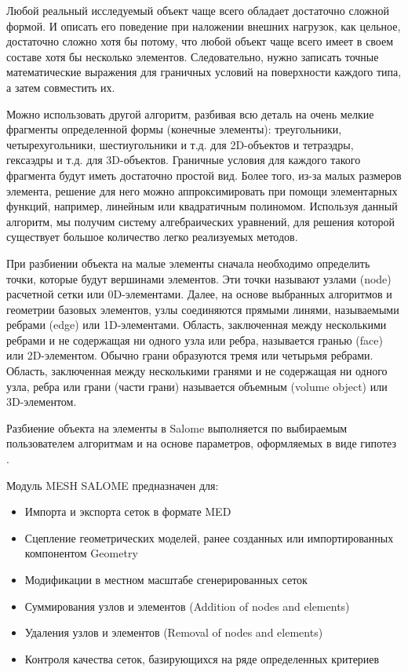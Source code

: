 \documentclass[a4paper,12pt]{article}
\theoremstyle{plain} %
\theoremstyle{definition} %
\theoremstyle{remark} %
\begin{document}
	Любой реальный исследуемый объект чаще всего обладает достаточно сложной формой. И описать его поведение при наложении внешних нагрузок, как цельное, достаточно сложно хотя бы потому, что любой объект чаще всего имеет в своем составе хотя бы несколько элементов. Следовательно, нужно записать точные математические выражения для граничных условий на поверхности каждого типа, а затем совместить их.
		
	Можно использовать другой алгоритм, разбивая всю деталь на очень мелкие фрагменты определенной формы (конечные элементы): треугольники, четырехугольники, шестиугольники и т.д. для 2D-объектов и тетраэдры, гексаэдры и т.д. для 3D-объектов. Граничные условия для каждого такого фрагмента будут иметь достаточно простой вид. Более того, из-за малых размеров элемента, решение для него можно аппроксимировать при помощи элементарных функций, например, линейным или квадратичным полиномом. Используя данный алгоритм, мы получим систему алгебраических уравнений, для решения которой существует большое количество легко реализуемых методов.
		
	При разбиении объекта на малые элементы сначала необходимо определить точки, которые будут вершинами элементов. Эти точки называют узлами (node) расчетной сетки или 0D-элементами. Далее, на основе выбранных алгоритмов и геометрии базовых элементов, узлы соединяются прямыми линями, называемыми ребрами (edge) или 1D-элементами. Область, заключенная между несколькими ребрами и не содержащая ни одного узла или ребра, называется гранью (face) или 2D-элементом. Обычно грани образуются тремя или четырьмя ребрами. Область, заключенная между несколькими гранями и не содержащая ни одного узла, ребра или грани (части грани) называется объемным (volume object) или 3D-элементом.
		
	Разбиение объекта на элементы в Salome выполняется по выбираемым пользователем алгоритмам и на основе параметров, оформляемых в виде гипотез \cite{wIbmSalomeMesh}.
		
	Модуль MESH SALOME предназначен для\cite{wOfDoc}:
	\begin{itemize}
		\item Импорта и экспорта сеток в формате MED
		\item Сцепление геометрических моделей, ранее созданных или импортированных компонентом Geometry
		\item Модификации в местном масштабе сгенерированных сеток
		\item Суммирования узлов и элементов (Addition of nodes and elements)
		\item Удаления узлов и элементов (Removal of nodes and elements)
		\item Контроля качества сеток, базирующихся на ряде определенных критериев
	\end{itemize}
\end{document}
